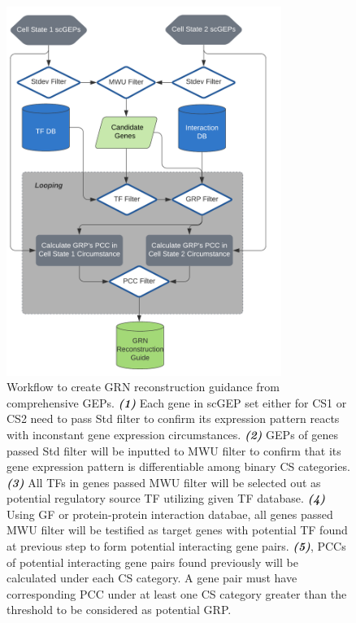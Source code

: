 \documentclass[fleqn,10pt]{wlscirep}
\begin{document}
\begin{figure}[ht]
\centering
\includegraphics[width=0.8\linewidth, height=12cm, keepaspectratio,]{image/Kirke.png}
\caption{
Workflow to create GRN reconstruction guidance from comprehensive GEPs.
\textbf{\emph{(1)}} Each gene in scGEP set either for CS1 or CS2 need to pass Std filter to confirm its expression pattern reacts with inconstant gene expression circumstances.
\textbf{\emph{(2)}} GEPs of genes passed Std filter will be inputted to MWU filter to confirm that its gene expression pattern is differentiable among binary CS categories.
\textbf{\emph{(3)}} All TFs in genes passed MWU filter will be selected out as potential regulatory source TF utilizing given TF database.
\textbf{\emph{(4)}} Using GF or protein-protein interaction databae, all genes passed MWU filter will be testified as target genes with potential TF found at previous step to form potential interacting gene pairs.
\textbf{\emph{(5)}}, PCCs of potential interacting gene pairs found previously will be calculated under each CS category. A gene pair must have corresponding PCC under at least one CS category greater than the threshold to be considered as potential GRP.
}
\label{kirke}
\end{figure}
\end{document}
